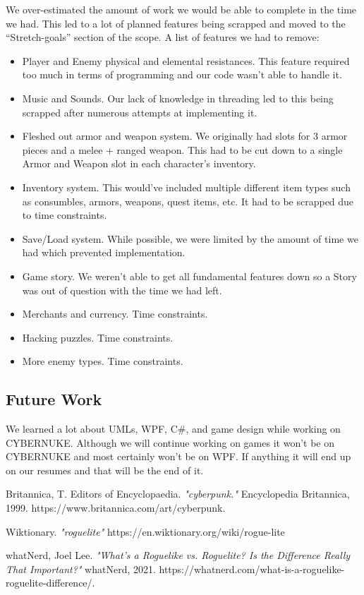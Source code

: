 \documentclass[10pt,conference,onecolumn,compsoc]{IEEEtran}
\begin{document}
We over-estimated the amount of work we would be able to complete in the time we had. This led to a lot of planned features being scrapped and moved to the “Stretch-goals” section of the scope.
A list of features we had to remove:
\begin{itemize}
	\item Player and Enemy physical and elemental resistances. This feature required too much in terms of programming and our code wasn't able to handle it.
	\item Music and Sounds. Our lack of knowledge in threading led to this being scrapped after numerous attempts at implementing it.
	\item Fleshed out armor and weapon system. We originally had slots for 3 armor pieces and a melee + ranged weapon. This had to be cut down to a single Armor and Weapon slot in each character's inventory.
	\item Inventory system. This would've included multiple different item types such as consumbles, armors, weapons, quest items, etc. It had to be scrapped due to time constraints.
	\item Save/Load system. While possible, we were limited by the amount of time we had which prevented implementation.
	\item Game story. We weren't able to get all fundamental features down so a Story was out of question with the time we had left.
	\item Merchants and currency. Time constraints.
	\item Hacking puzzles. Time constraints.
	\item More enemy types. Time constraints.
\end{itemize}

\subsection{Future Work}
We learned a lot about UMLs, WPF, C\#, and game design while working on CYBERNUKE. Although we will continue working on games it won't be on CYBERNUKE and most certainly won't be on WPF. If anything it will end up on our resumes and that will be the end of it.





\begin{thebibliography}{1}

Britannica, T. Editors of Encyclopaedia. \emph{"cyberpunk."} Encyclopedia Britannica, 1999. https://www.britannica.com/art/cyberpunk.

Wiktionary. \emph{"roguelite"}
https://en.wiktionary.org/wiki/rogue-lite

whatNerd, Joel Lee. \emph{"What’s a Roguelike vs. Roguelite? Is the Difference Really That Important?"} whatNerd, 2021. https://whatnerd.com/what-is-a-roguelike-roguelite-difference/.

\end{thebibliography}

\end{document}
